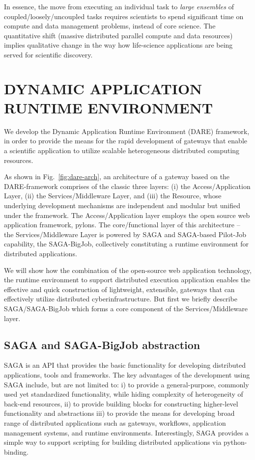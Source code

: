 \documentclass{sig-alternate}
\begin{document}
In essence, the move from executing an individual task to
\textit{large ensembles} of coupled/loosely/uncoupled tasks requires
scientists to spend significant time on compute and data management
problems, instead of core science.  The quantitative shift (massive
distributed parallel compute and data resources) implies qualitative
change in the way how life-science applications are being served for
scientific discovery.


\section{DYNAMIC APPLICATION RUNTIME ENVIRONMENT}

We develop the Dynamic Application Runtime Environment (DARE)
framework\cite{dareurl}, in order to provide the means for the rapid
development of gateways that enable a scientific application to
utilize scalable heterogeneous distributed computing resources.

As shown in Fig.~\ref{fig:dare-arch}, an architecture of a gateway
based on the DARE-framework comprises of the classic three layers: (i)
the Access/Application Layer, (ii) the Services/Middleware Layer, and (iii) the
Resource, whose underlying development mechanisms are independent and
modular but unified under the framework.  The Access/Application layer
employs the open source web application framework,
pylons\cite{pylonsurl}.  The core/functional layer of this
architecture -- the Services/Middleware Layer is powered by SAGA and
SAGA-based Pilot-Job capability, the SAGA-BigJob\cite{saga-ccgrid10,jha2009developing,ecmls10, ecmls11},
collectively constituting a runtime environment for distributed
applications.

We will show how the combination of the open-source web application
technology, the runtime environment to support distributed execution
application enables the effective and quick construction of
lightweight, extensible, gateways that can effectively utilize
distributed cyberinfrastructure. But first we briefly describe
SAGA/SAGA-BigJob which forms a core component of the
Services/Middleware layer.

\subsection{SAGA and SAGA-BigJob abstraction}

SAGA is an API that provides the basic functionality for developing
distributed applications, tools and frameworks\cite{saga_url}. The key
advantages of the development using SAGA include, but are not limited
to: i) to provide a general-purpose, commonly used yet standardized
functionality, while hiding complexity of heterogeneity of back-end
resources, ii) to provide building blocks for constructing higher-level
functionality and abstractions iii) to provide the means for
developing broad range of distributed applications such as gateways,
workflows, application management systems, and runtime environments.
Interestingly, SAGA provides a simple way to support scripting
for building distributed applications via python-binding. 
\end{document}
